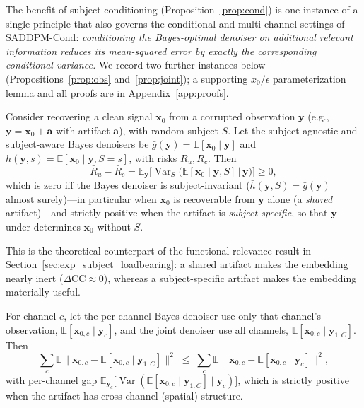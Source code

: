 The benefit of subject conditioning  (Proposition~\ref{prop:cond}) is one instance
of a single principle that also governs the conditional and multi-channel settings of \mbox{SADDPM-Cond}: \emph{conditioning the Bayes-optimal denoiser on additional relevant information reduces its mean-squared error by exactly the corresponding conditional variance.} We record two further instances below (Propositions~\ref{prop:obs} and~\ref{prop:joint}); a supporting $x_0/\epsilon$ parameterization lemma and all proofs are in Appendix~\ref{app:proofs}.

\begin{proposition}
\label{prop:obs}
Consider recovering a clean signal $\mathbf{x}_0$ from a corrupted observation
$\mathbf{y}$ (e.g., $\mathbf{y}=\mathbf{x}_0+\mathbf{a}$ with artifact
$\mathbf{a}$), with random subject $S$. Let the subject-agnostic and subject-aware Bayes denoisers be $\bar{g}(\mathbf{y})=\mathbb{E}[\mathbf{x}_0\mid\mathbf{y}]$ and
$\bar{h}(\mathbf{y},s)=\mathbb{E}[\mathbf{x}_0\mid\mathbf{y},S{=}s]$, with risks
$\bar{R}_u,\bar{R}_c$. Then
\begin{equation}
  \bar{R}_u-\bar{R}_c=\mathbb{E}_{\mathbf{y}}\!\big[\operatorname{Var}_{S}\!\big(\mathbb{E}[\mathbf{x}_0\mid\mathbf{y},S]\,\big|\,\mathbf{y}\big)\big]\ge 0,
  \label{eq:obs}
\end{equation}
which is zero iff the Bayes denoiser is subject-invariant ($\bar{h}(\mathbf{y},S)=\bar{g}(\mathbf{y})$ almost surely)---in particular when
$\mathbf{x}_0$ is recoverable from $\mathbf{y}$ alone (a \emph{shared}
artifact)---and strictly positive when the artifact is \emph{subject-specific}, so
that $\mathbf{y}$ under-determines $\mathbf{x}_0$ without $S$.
\end{proposition}

This is the theoretical counterpart of the functional-relevance result in Section~\ref{sec:exp_subject_loadbearing}: a shared artifact makes the embedding nearly inert ($\Delta\mathrm{CC}\approx 0$), whereas a subject-specific artifact makes the embedding materially useful.

\begin{proposition}
\label{prop:joint}
For channel $c$, let the per-channel Bayes denoiser use only that channel's observation, $\mathbb{E}[\mathbf{x}_{0,c}\mid\mathbf{y}_c]$, and the joint denoiser use all channels, $\mathbb{E}[\mathbf{x}_{0,c}\mid\mathbf{y}_{1:C}]$. Then
\begin{equation}
  \sum_{c}\mathbb{E}\big\|\mathbf{x}_{0,c}-\mathbb{E}[\mathbf{x}_{0,c}\mid\mathbf{y}_{1:C}]\big\|^2
  \;\le\;
  \sum_{c}\mathbb{E}\big\|\mathbf{x}_{0,c}-\mathbb{E}[\mathbf{x}_{0,c}\mid\mathbf{y}_c]\big\|^2,
  \label{eq:joint}
\end{equation}
with per-channel gap
$\mathbb{E}_{\mathbf{y}_c}\!\big[\operatorname{Var}(\mathbb{E}[\mathbf{x}_{0,c}\mid\mathbf{y}_{1:C}]\mid\mathbf{y}_c)\big]$,
which is strictly positive when the artifact has cross-channel (spatial) structure.
\end{proposition}

